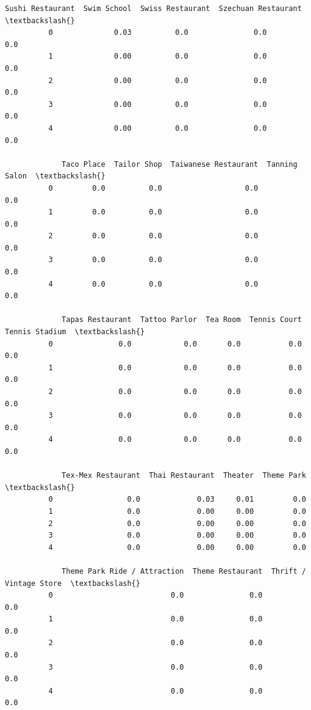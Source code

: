 \documentclass[11pt]{article}
\begin{document}
\begin{Verbatim}[commandchars=\\\{\}]
             Sushi Restaurant  Swim School  Swiss Restaurant  Szechuan Restaurant  \textbackslash{}
          0              0.03          0.0               0.0                  0.0   
          1              0.00          0.0               0.0                  0.0   
          2              0.00          0.0               0.0                  0.0   
          3              0.00          0.0               0.0                  0.0   
          4              0.00          0.0               0.0                  0.0   
          
             Taco Place  Tailor Shop  Taiwanese Restaurant  Tanning Salon  \textbackslash{}
          0         0.0          0.0                   0.0            0.0   
          1         0.0          0.0                   0.0            0.0   
          2         0.0          0.0                   0.0            0.0   
          3         0.0          0.0                   0.0            0.0   
          4         0.0          0.0                   0.0            0.0   
          
             Tapas Restaurant  Tattoo Parlor  Tea Room  Tennis Court  Tennis Stadium  \textbackslash{}
          0               0.0            0.0       0.0           0.0             0.0   
          1               0.0            0.0       0.0           0.0             0.0   
          2               0.0            0.0       0.0           0.0             0.0   
          3               0.0            0.0       0.0           0.0             0.0   
          4               0.0            0.0       0.0           0.0             0.0   
          
             Tex-Mex Restaurant  Thai Restaurant  Theater  Theme Park  \textbackslash{}
          0                 0.0             0.03     0.01         0.0   
          1                 0.0             0.00     0.00         0.0   
          2                 0.0             0.00     0.00         0.0   
          3                 0.0             0.00     0.00         0.0   
          4                 0.0             0.00     0.00         0.0   
          
             Theme Park Ride / Attraction  Theme Restaurant  Thrift / Vintage Store  \textbackslash{}
          0                           0.0               0.0                     0.0   
          1                           0.0               0.0                     0.0   
          2                           0.0               0.0                     0.0   
          3                           0.0               0.0                     0.0   
          4                           0.0               0.0                     0.0   
          

\end{Verbatim}
\end{document}
